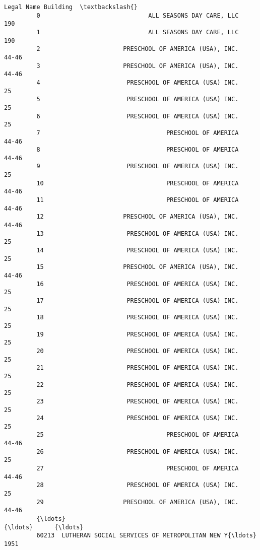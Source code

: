 \documentclass[11pt]{article}
\begin{document}
\begin{Verbatim}[commandchars=\\\{\}]
                                                       Legal Name Building  \textbackslash{}
         0                              ALL SEASONS DAY CARE, LLC      190   
         1                              ALL SEASONS DAY CARE, LLC      190   
         2                       PRESCHOOL OF AMERICA (USA), INC.    44-46   
         3                       PRESCHOOL OF AMERICA (USA), INC.    44-46   
         4                        PRESCHOOL OF AMERICA (USA) INC.       25   
         5                        PRESCHOOL OF AMERICA (USA) INC.       25   
         6                        PRESCHOOL OF AMERICA (USA) INC.       25   
         7                                   PRESCHOOL OF AMERICA    44-46   
         8                                   PRESCHOOL OF AMERICA    44-46   
         9                        PRESCHOOL OF AMERICA (USA) INC.       25   
         10                                  PRESCHOOL OF AMERICA    44-46   
         11                                  PRESCHOOL OF AMERICA    44-46   
         12                      PRESCHOOL OF AMERICA (USA), INC.    44-46   
         13                       PRESCHOOL OF AMERICA (USA) INC.       25   
         14                       PRESCHOOL OF AMERICA (USA) INC.       25   
         15                      PRESCHOOL OF AMERICA (USA), INC.    44-46   
         16                       PRESCHOOL OF AMERICA (USA) INC.       25   
         17                       PRESCHOOL OF AMERICA (USA) INC.       25   
         18                       PRESCHOOL OF AMERICA (USA) INC.       25   
         19                       PRESCHOOL OF AMERICA (USA) INC.       25   
         20                       PRESCHOOL OF AMERICA (USA) INC.       25   
         21                       PRESCHOOL OF AMERICA (USA) INC.       25   
         22                       PRESCHOOL OF AMERICA (USA) INC.       25   
         23                       PRESCHOOL OF AMERICA (USA) INC.       25   
         24                       PRESCHOOL OF AMERICA (USA) INC.       25   
         25                                  PRESCHOOL OF AMERICA    44-46   
         26                       PRESCHOOL OF AMERICA (USA) INC.       25   
         27                                  PRESCHOOL OF AMERICA    44-46   
         28                       PRESCHOOL OF AMERICA (USA) INC.       25   
         29                      PRESCHOOL OF AMERICA (USA), INC.    44-46   
         {\ldots}                                                  {\ldots}      {\ldots}   
         60213  LUTHERAN SOCIAL SERVICES OF METROPOLITAN NEW Y{\ldots}     1951   

\end{Verbatim}
\end{document}
